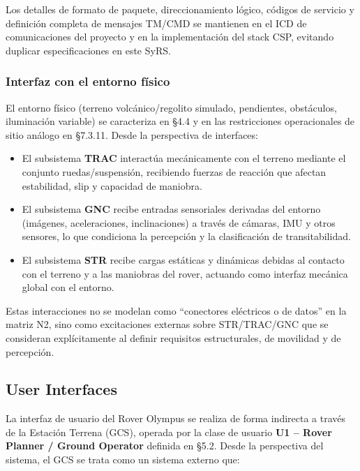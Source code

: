 Los detalles de formato de paquete, direccionamiento lógico, códigos de servicio y definición completa de mensajes TM/CMD se mantienen en el ICD de comunicaciones del proyecto y en la implementación del stack CSP, evitando duplicar especificaciones en este SyRS.

\subsubsection{Interfaz con el entorno físico}

El entorno físico (terreno volcánico/regolito simulado, pendientes, obstáculos, iluminación variable) se caracteriza en §4.4 y en las restricciones operacionales de sitio análogo en §7.3.11. Desde la perspectiva de interfaces:

\begin{itemize}
    \item El subsistema \textbf{TRAC} interactúa mecánicamente con el terreno mediante el conjunto ruedas/suspensión, recibiendo fuerzas de reacción que afectan estabilidad, slip y capacidad de maniobra.
    \item El subsistema \textbf{GNC} recibe entradas sensoriales derivadas del entorno (imágenes, aceleraciones, inclinaciones) a través de cámaras, IMU y otros sensores, lo que condiciona la percepción y la clasificación de transitabilidad.
    \item El subsistema \textbf{STR} recibe cargas estáticas y dinámicas debidas al contacto con el terreno y a las maniobras del rover, actuando como interfaz mecánica global con el entorno.
\end{itemize}

Estas interacciones no se modelan como ``conectores eléctricos o de datos'' en la matriz N2, sino como excitaciones externas sobre STR/TRAC/GNC que se consideran explícitamente al definir requisitos estructurales, de movilidad y de percepción.

\subsection{User Interfaces}\label{subsec:user_interfaces}

La interfaz de usuario del Rover Olympus se realiza de forma indirecta a través de la Estación Terrena (GCS), operada por la clase de usuario \textbf{U1 -- Rover Planner / Ground Operator} definida en §5.2. Desde la perspectiva del sistema, el GCS se trata como un sistema externo que:

